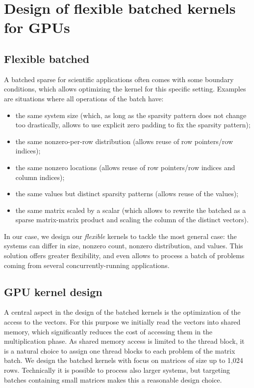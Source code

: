 \section{Design of flexible batched \spmv kernels for GPUs}
\label{2017-batched-spmv:sec:s3-kerneldesign}

\subsection{Flexible batched \spmv}

A batched sparse \spmv for scientific applications often
comes with some boundary conditions, which allows optimizing the kernel
for this specific setting. Examples are situations where all \spmv operations of the batch have:
\begin{itemize}
\itemsep=0pt
\item
the same system size (which, as long as the sparsity pattern does not change too drastically,
allows to use explicit zero padding to fix the sparsity pattern);
\item
the same nonzero-per-row distribution 
(allows reuse of row pointers/row indices);
\item
the same nonzero locations
(allows reuse of row pointers/row indices and column indices);
\item
the same values but distinct sparsity patterns (allows reuse of the values);
\item
the same matrix scaled by a scalar
(which allows to rewrite the batched \spmv as a sparse matrix-matrix product and scaling the column of the distinct vectors).
\end{itemize}
In our case, we design our 
{\em flexible} kernels to tackle the most general case:
the systems can differ in size, nonzero count, nonzero distribution, and values. 
This solution offers greater flexibility, and even allows to process a batch of problems
coming from several concurrently-running applications.

\subsection{GPU kernel design}

A central aspect in the design of the batched kernels is the optimization of
the access to the vectors. For this purpose we initially read the vectors into
shared memory, which significantly reduces the cost of accessing them 
in the multiplication phase. As shared memory access is limited to the thread block,
it is a natural choice to assign one thread blocks to each problem of the matrix batch.
We design the batched \spmv kernels with focus on matrices of size up to 1,024 rows.
Technically it is possible to process also larger systems, 
but targeting batches containing small matrices makes this a reasonable design choice.

